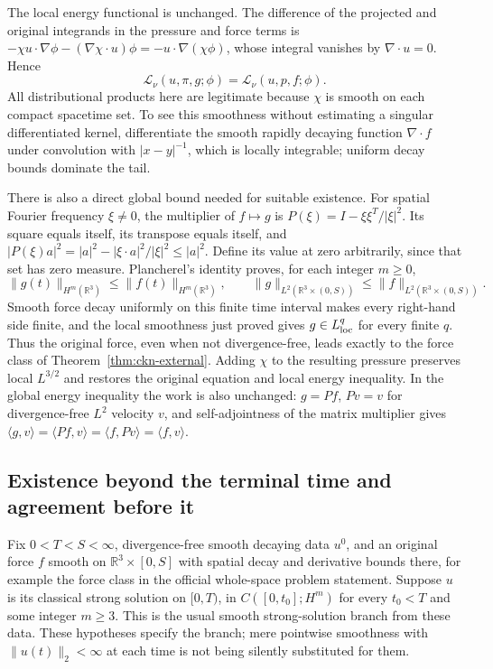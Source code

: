 The local energy functional is unchanged. The difference of the
projected and original integrands in the pressure and force terms is
$-\chi u\cdot\nabla\phi-(\nabla\chi\cdot u)\phi
=-u\cdot\nabla(\chi\phi)$, whose integral vanishes by
$\nabla\cdot u=0$. Hence
\begin{equation}\label{eq:ckn-force-projection-lei}
 \mathcal L_\nu(u,\pi,g;\phi)
 =\mathcal L_\nu(u,p,f;\phi).
\end{equation}
All distributional products here are legitimate because $\chi$ is smooth
on each compact spacetime set. To see this smoothness without estimating
a singular differentiated kernel, differentiate the smooth rapidly
decaying function $\nabla\cdot f$ under convolution with $|x-y|^{-1}$,
which is locally integrable; uniform decay bounds dominate the tail.

There is also a direct global bound needed for suitable existence.
For spatial Fourier frequency $\xi\ne0$, the multiplier of
$f\mapsto g$ is
$P(\xi)=I-\xi\xi^T/|\xi|^2$. Its square equals itself, its transpose
equals itself, and
$|P(\xi)a|^2=|a|^2-|\xi\cdot a|^2/|\xi|^2\leq|a|^2$.
Define its value at zero arbitrarily, since that set has zero measure.
Plancherel's identity proves, for each integer $m\geq0$,
\begin{equation}\label{eq:ckn-force-projection-norms}
 \|g(t)\|_{H^m(\mathbb R^3)}\leq\|f(t)\|_{H^m(\mathbb R^3)},
 \qquad
 \|g\|_{L^2(\mathbb R^3\times(0,S))}
 \leq\|f\|_{L^2(\mathbb R^3\times(0,S))}.
\end{equation}
Smooth force decay uniformly on this finite time interval makes every
right-hand side finite, and the local smoothness just proved gives
$g\in L^q_{\rm loc}$ for every finite $q$. Thus the original force,
even when not divergence-free, leads exactly to the force class of
Theorem~\ref{thm:ckn-external}. Adding $\chi$ to the resulting pressure
preserves local $L^{3/2}$ and restores the original equation and local
energy inequality. In the global energy inequality the work is also
unchanged: $g=Pf$, $Pv=v$ for divergence-free $L^2$ velocity $v$, and
self-adjointness of the matrix multiplier gives
$\langle g,v\rangle=\langle Pf,v\rangle=\langle f,Pv\rangle
=\langle f,v\rangle$.

\subsection{Existence beyond the terminal time and agreement before it}

Fix $0<T<S<\infty$, divergence-free smooth decaying data $u^0$, and
an original force $f$ smooth on $\mathbb R^3\times[0,S]$ with spatial
decay and derivative bounds there, for example the force class in the
official whole-space problem statement. Suppose $u$ is its classical
strong solution on $[0,T)$, in $C([0,t_0];H^m)$ for every $t_0<T$
and some integer $m\geq3$. This is the usual smooth strong-solution
branch from these data. These hypotheses specify the branch; mere
pointwise smoothness with $\|u(t)\|_2<\infty$ at each time is not being
silently substituted for them.

